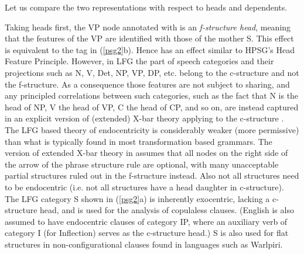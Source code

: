 \eal 
 \label{psg2}
\ex
{
}
               
\ex 
{
}
\zl

\noindent
Let us compare the two representations with respect to heads and dependents.

Taking heads first, the VP node annotated with \updown{} is an \textit{f-structure head}, meaning that the features of the VP are identified with those of the mother S.  This effect is equivalent to the tag  in (\ref{psg2}b).    Hence  \updown{} has an effect similar to HPSG's Head Feature Principle.  However, in LFG the part of speech categories and their projections such as N, V, Det, NP, VP, DP, etc. belong to the c-structure and not the f-structure.  As a consequence those features are not subject to sharing, and any principled correlations between such categories, such as the fact that N is the head of NP, V the head of VP, C the head of CP, and so on, are instead captured in an explicit version of (extended) X-bar theory applying to the c-structure \citep{grimshaw98}.  The  LFG based theory of endocentricity is considerably weaker (more permissive) than what is typically found in most transformation based grammars.  The version of extended X-bar theory in \citet[Chapter 6]{BATW2015a} assumes that all nodes on the right side of the arrow of the phrase structure rule are optional, with many unacceptable partial structures ruled out in the f-structure instead.  Also not all structures need to be endocentric (i.e. not all structures have a head daughter in c-structure).  The LFG category S shown in (\ref{psg2}a) is inherently exocentric, lacking a c-structure head, and is used for the analysis of copulaless clauses.   (English is also assumed to have endocentric clauses of category IP, where an auxiliary verb of category I (for Inflection) serves as the c-structure head.)  S is also used for flat structures in non-configurational clauses found in languages such as Warlpiri.   

